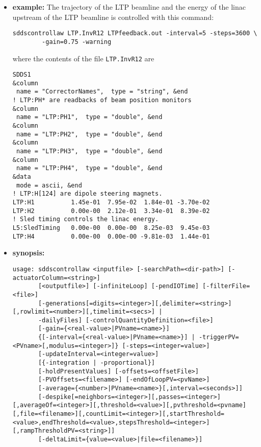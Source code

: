 \begin{itemize}
\item {\bf example:} 
%
% 
%
The trajectory of the LTP beamline and the energy of the linac upstream of the LTP
beamline is controlled with this command:
\begin{verbatim}
sddscontrollaw LTP.InvR12 LTPfeedback.out -interval=5 -steps=3600 \
        -gain=0.75 -warning
\end{verbatim}
where the contents of the file \verb+LTP.InvR12+ are
\begin{verbatim}
SDDS1
&column
 name = "CorrectorNames",  type = "string", &end
! LTP:PH* are readbacks of beam position monitors
&column
 name = "LTP:PH1",  type = "double", &end
&column             
 name = "LTP:PH2",  type = "double", &end
&column             
 name = "LTP:PH3",  type = "double", &end
&column             
 name = "LTP:PH4",  type = "double", &end
&data
 mode = ascii, &end
! LTP:H[124] are dipole steering magnets.
LTP:H1          1.45e-01  7.95e-02  1.84e-01 -3.70e-02 
LTP:H2          0.00e-00  2.12e-01  3.34e-01  8.39e-02 
! Sled timing controls the linac energy.
L5:SledTiming   0.00e-00  0.00e-00  8.25e-03  9.45e-03 
LTP:H4          0.00e-00  0.00e-00 -9.81e-03  1.44e-01 
\end{verbatim}
\item {\bf synopsis:} 
%
%
\begin{verbatim}
usage: sddscontrollaw <inputfile> [-searchPath=<dir-path>] [-actuatorColumn=<string>]
       [<outputfile>] [-infiniteLoop] [-pendIOTime] [-filterFile=<file>]
       [-generations[=digits=<integer>][,delimiter=<string>][,rowlimit=<number>][,timelimit=<secs>] |
       -dailyFiles] [-controlQuantityDefinition=<file>]
       [-gain={<real-value>|PVname=<name>}]
       {[-interval={<real-value>|PVname=<name>}] | -triggerPV=<PVname>[,modulus=<integer>]} [-steps=<integer=value>]
       [-updateInterval=<integer=value>]
       [{-integration | -proportional}]
       [-holdPresentValues] [-offsets=<offsetFile>]
       [-PVOffsets=<filename>] [-endOfLoopPV=<pvName>]
       [-average={<number>|PVname=<name>}[,interval=<seconds>]]
       [-despike[=neighbors=<integer>][,passes=<integer>][,averageOf=<integer>][,threshold=<value>][,pvthreshold=<pvname][,file=<filename>][,countLimit=<integer>][,startThreshold=<value>,endThreshold=<value>,stepsThreshold=<integer>][,rampThresholdPV=<string>]]
       [-deltaLimit={value=<value>|file=<filename>}]

\end{verbatim}
\end{itemize}
